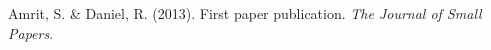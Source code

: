 \renewcommand{\bibname}{Bibliography}
\begin{thebibliography}{9}
  \bibitem{} Amrit, S. \& Daniel, R. (2013). First paper publication. \textit{The Journal of Small Papers}.

\end{thebibliography}
